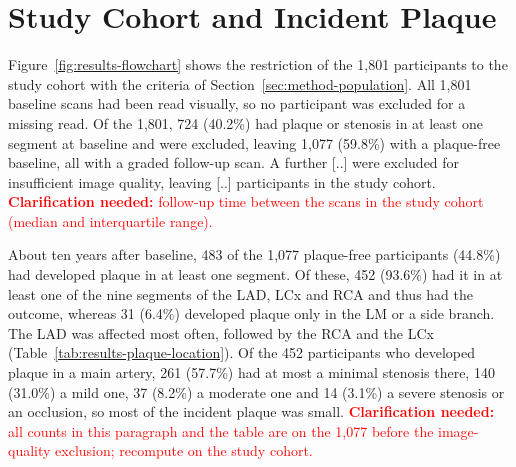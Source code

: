 \providecommand{\clarify}[1]{\textcolor{red}{\textbf{Clarification needed:} #1}}
\section{Study Cohort and Incident Plaque}
\label{sec:results-cohort}

Figure~\ref{fig:results-flowchart} shows the restriction of the 1,801 participants to the study cohort with the criteria of Section~\ref{sec:method-population}.
All 1,801 baseline scans had been read visually, so no participant was excluded for a missing read.
Of the 1,801, 724 (40.2\%) had plaque or stenosis in at least one segment at baseline and were excluded, leaving 1,077 (59.8\%) with a plaque-free baseline, all with a graded follow-up scan.
A further [..] were excluded for insufficient image quality, leaving [..] participants in the study cohort.
\clarify{follow-up time between the scans in the study cohort (median and interquartile range).}

About ten years after baseline, 483 of the 1,077 plaque-free participants (44.8\%) had developed plaque in at least one segment.
Of these, 452 (93.6\%) had it in at least one of the nine segments of the LAD, LCx and RCA and thus had the outcome, whereas 31 (6.4\%) developed plaque only in the LM or a side branch.
The LAD was affected most often, followed by the RCA and the LCx (Table~\ref{tab:results-plaque-location}).
Of the 452 participants who developed plaque in a main artery, 261 (57.7\%) had at most a minimal stenosis there, 140 (31.0\%) a mild one, 37 (8.2\%) a moderate one and 14 (3.1\%) a severe stenosis or an occlusion, so most of the incident plaque was small.
\clarify{all counts in this paragraph and the table are on the 1,077 before the image-quality exclusion; recompute on the study cohort.}


